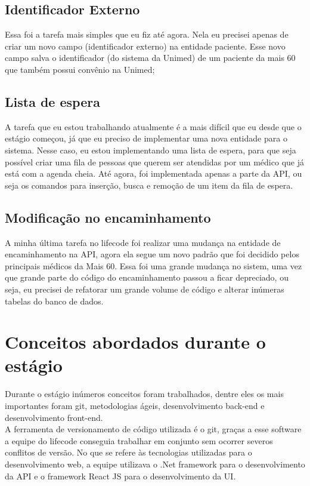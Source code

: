 \documentclass[12pt]{article}
\begin{document}
\subsection{Identificador Externo}
Essa foi a tarefa mais simples que eu fiz até agora. Nela eu precisei apenas de criar um novo campo (identificador externo) na entidade paciente. Esse novo campo salva o identificador (do sistema da Unimed) de um paciente da mais 60 que também possui convênio na Unimed;

\subsection{Lista de espera}
A tarefa que eu estou trabalhando atualmente é a mais difícil que eu desde que o estágio começou, já que eu preciso de implementar uma nova entidade para o sistema. Nesse caso, eu estou implementando uma lista de espera, para que seja possível criar uma fila de pessoas que querem ser atendidas por um médico que já está com a agenda cheia. Até agora, foi implementada apenas a parte da API, ou seja os comandos para inserção, busca e remoção de um item da fila de espera.

\subsection{Modificação no encaminhamento}
A minha última tarefa no lifecode foi realizar uma mudança na entidade de encaminhamento na API, agora ela segue um novo padrão que foi decidido pelos principais médicos da Mais 60. Essa foi uma grande mudança no sistem, uma vez que grande parte do código do encaminhamento passou a ficar depreciado, ou seja, eu precisei de refatorar um grande volume de código e alterar inúmeras tabelas do banco de dados. 



\section{Conceitos abordados durante o estágio}
Durante o estágio inúmeros conceitos foram trabalhados, dentre eles os mais importantes foram git, metodologias ágeis, desenvolvimento back-end e desenvolvimento front-end.
\\
A ferramenta de versionamento de código utilizada é o git, graças a esse software a equipe do lifecode conseguia trabalhar em conjunto sem ocorrer severos conflitos de versão. No que se refere às tecnologias utilizadas para o desenvolvimento web, a equipe utilizava o .Net framework para o desenvolvimento da API e o framework React JS para o desenvolvimento da UI.
\end{document}
